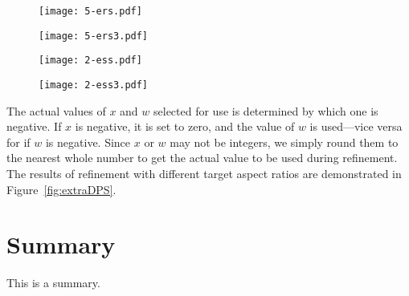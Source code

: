\begin{figure*}[ht!]
	\centering
	\begin{subfigure}[]{0.25\textwidth}
		\centering
		\texttt{[image: 5-ers.pdf]}
		\caption{}
		\label{fig:ers1}
	\end{subfigure}%
	\begin{subfigure}[]{0.25\textwidth}
		\centering
		\texttt{[image: 5-ers3.pdf]}
		\caption{}
		\label{fig:ers3}
	\end{subfigure}%
	\begin{subfigure}[]{0.25\textwidth}
		\centering
		\texttt{[image: 2-ess.pdf]}
		\caption{}
		\label{fig:ess1}
	\end{subfigure}%
	\begin{subfigure}[]{0.25\textwidth}
		\centering
		\texttt{[image: 2-ess3.pdf]}
		\caption{}
		\label{fig:ess3}
	\end{subfigure}
	
	\caption[Prismatoid refinement modified to achieve different cell aspect ratios]{
		A demonstration of how refinement can be modified to affect the aspect ratio of cells.
		All figures show a starting pyramid cell from a grid with 200 cells in its initial discretization.
		Central layer with five extra radial splits ($a = 3$ to get $x = 5$) at (a) one level of refinement and (b) three levels.
		Central layer with two applications of the surface refinement scheme ($a = 1/8$ to get $w = 2$) at (c) one level of refinement and (d) three levels
	}
	\label{fig:extraDPS}
\end{figure*}


The actual values of $x$ and $w$ selected for use is determined by which one is negative.
If $x$ is negative, it is set to zero, and the value of $w$ is used---vice versa for if $w$ is negative.
Since $x$ or $w$ may not be integers, we simply round them to the nearest whole number to get the actual value to be used during refinement.
The results of refinement with different target aspect ratios are demonstrated in Figure~\ref{fig:extraDPS}.


\section{Summary}
This is a summary.

